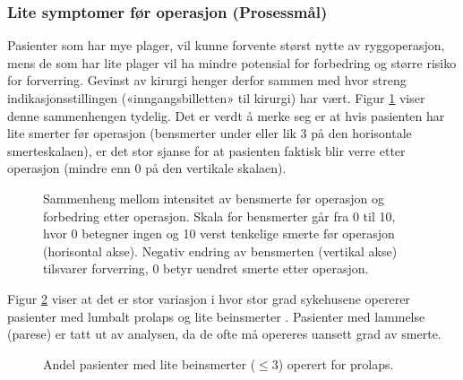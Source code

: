 \documentclass [norsk,a4paper,twoside]{article}\usepackage[]{graphicx}\usepackage[]{color}
\begin{document}
									


 \subsubsection{Lite symptomer før operasjon (Prosessmål)}     
      Pasienter som har mye plager, vil kunne forvente størst nytte av ryggoperasjon,
mens de som har lite plager vil ha mindre potensial for forbedring og større risiko
for forverring. Gevinst av kirurgi henger derfor sammen med hvor streng
indikasjonsstillingen («inngangsbilletten» til kirurgi) har vært. Figur \ref{fig:BeinsmEndrPre} viser denne
sammenhengen tydelig. Det er verdt å merke seg er at hvis pasienten har lite smerter før
operasjon (bensmerter under eller lik 3 på den horisontale smerteskalaen), er det stor
sjanse for at pasienten faktisk blir verre  etter
operasjon (mindre enn 0 på den vertikale skalaen). \\

\begin{figure}[ht]
\caption{\label{fig:BeinsmEndrPre}  Sammenheng mellom intensitet av bensmerte før operasjon og
      forbedring etter operasjon. Skala for bensmerter går fra 0 til 10, hvor 0 betegner
      ingen og 10 verst tenkelige smerte før operasjon (horisontal akse). Negativ endring
      av bensmerten (vertikal akse) tilsvarer forverring, 0 betyr uendret smerte etter
      operasjon.}
\end{figure}

\clearpage

Figur \ref{fig:BeinsmLavPre} viser at det er stor variasjon i hvor stor grad sykehusene opererer
pasienter med lumbalt prolaps og lite beinsmerter . Pasienter med lammelse (parese) er tatt
ut av analysen, da de ofte må opereres uansett grad av smerte.




\begin{figure}[ht]
\caption{\label{fig:BeinsmLavPre}  Andel pasienter med lite beinsmerter ($\leq 3$) operert for prolaps.}
\end{figure}
\end{document}
